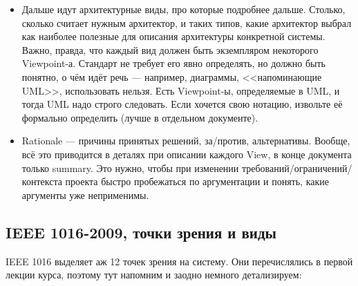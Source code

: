 \documentclass[a5paper]{article}
\begin{document}
\begin{itemize}
\begin{itemize}
        \end{itemize}
    \item Дальше идут архитектурные виды, про которые подробнее дальше. Столько, сколько считает нужным архитектор, и таких типов, какие архитектор выбрал как наиболее полезные для описания архитектуры конкретной системы. Важно, правда, что каждый вид должен быть экземпляром некоторого Viewpoint-а. Стандарт не требует его явно определять, но должно быть понятно, о чём идёт речь --- например, диаграммы, <<напоминающие UML>>, использовать нельзя. Есть Viewpoint-ы, определяемые в UML, и тогда UML надо строго следовать. Если хочется свою нотацию, извольте её формально определить (лучше в отдельном документе).
    \item Rationale --- причины принятых решений, за/против, альтернативы. Вообще, всё это приводится в деталях при описании каждого View, в конце документа только summary. Это нужно, чтобы при изменении требований/ограничений/контекста проекта быстро пробежаться по аргументации и понять, какие аргументы уже неприменимы.
\end{itemize}

\subsection{IEEE 1016-2009, точки зрения и виды}

IEEE 1016 выделяет аж 12 точек зрения на систему. Они перечислялись в первой лекции курса, поэтому тут напомним и заодно немного детализируем:
\end{document}
